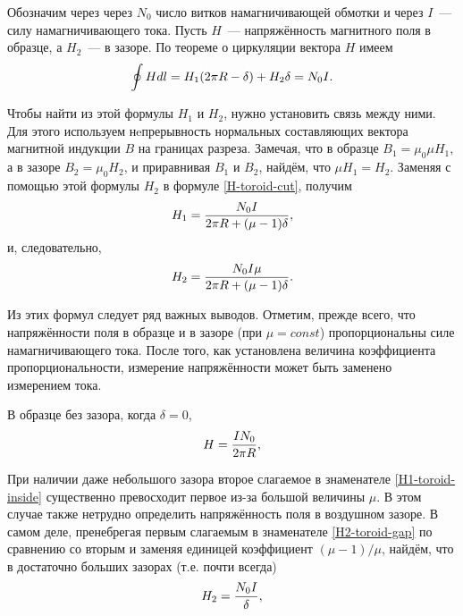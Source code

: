 Обозначим через через $N_0$ число витков намагничивающей обмотки и через $I$~--- силу намагничивающего тока. Пусть $H$~--- напряжённость магнитного поля в образце, а $H_2$~--- в зазоре. По теореме о циркуляции вектора $H$ имеем
\begin{equation}
	\eqmark{H-toroid-cut}
	\oint {Hdl} = H_1 (2\pi R - \delta) + H_2 \delta  = N_0 I.
\end{equation}

Чтобы найти из этой формулы $H_1$ и $H_2$, нужно установить связь между ними. Для этого используем нeпрерывность нормальных составляющих вектора магнитной индукции $B$ на границах разреза. Замечая, что в образце $B_1 = \mu_0 \mu H_1$, а в зазоре $B_2 = \mu_0 H_2$, и приравнивая $B_1$ и $B_2$, найдём, что $\mu H_1 = H_2$. Заменяя с помощью этой формулы $H_2$ в формуле \eqref{H-toroid-cut}, получим
\begin{equation}
	\eqmark{H1-toroid-inside}
	H_1 = \frac{N_0 I}{2\pi R + (\mu - 1)\delta},
\end{equation}
и, следовательно,
\begin{equation}
	\eqmark{H2-toroid-gap}
	H_2 = \frac{N_0 I \mu}{2\pi R + (\mu - 1)\delta}.
\end{equation}

Из этих формул следует ряд важных выводов. Отметим, прежде всего, что напряжённости поля в образце и в зазоре (при $\mu = const$) пропорциональны силе намагничивающего тока. После того, как установлена величина коэффициента пропорциональности, измерение напряжённости может быть заменено измерением тока.

В образце без зазора, когда $\delta = 0$,
\begin{equation}
	\eqmark{H-toroid-without gap}
	H = \frac{IN_0}{2\pi R},
\end{equation}

При наличии даже небольшого зазора второе слагаемое в знаменателе \eqref{H1-toroid-inside} существенно превосходит первое из-за большой величины $\mu$. В этом случае также нетрудно определить напряжённость поля в воздушном зазоре. В самом деле, пренебрегая первым слагаемым в знаменателе \eqref{H2-toroid-gap} по сравнению со вторым и заменяя единицей коэффициент $(\mu - 1)/\mu$, найдём, что в достаточно больших зазорах (т.е. почти всегда)
\begin{equation}
	\eqmark{H2-toroid-big gap}
	H_2 = \frac{N_0 I}{\delta},
\end{equation}

